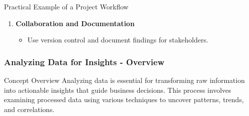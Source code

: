 \documentclass[aspectratio=169]{beamer}
\begin{document}
\begin{frame}[fragile]
\begin{block}{Practical Example of a Project Workflow}
\begin{enumerate}
            \item \textbf{Collaboration and Documentation}
            \begin{itemize}
                \item Use version control and document findings for stakeholders.
            \end{itemize}
        \end{enumerate}
    \end{block}
\end{frame}

\begin{frame}[fragile]
    \frametitle{Analyzing Data for Insights - Overview}
    \begin{block}{Concept Overview}
        Analyzing data is essential for transforming raw information into actionable insights that guide business decisions. 
        This process involves examining processed data using various techniques to uncover patterns, trends, and correlations.
    \end{block}
\end{frame}
\end{document}
